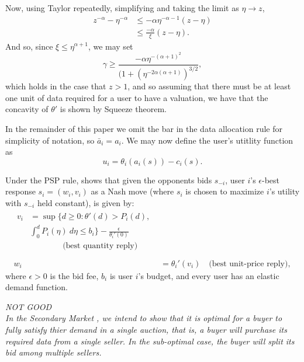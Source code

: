 \documentclass[12pt]{article}
\theoremstyle{definition}
\begin{document}
\begin{multicols}{2}
\begin{itemize}
Now, using Taylor repeatedly, simplifying and taking the limit as $\eta \rightarrow z$,
\begin{align*}
    z^{-\alpha} - \eta^{-\alpha} &\le -\alpha\eta^{-\alpha-1}(z-\eta) \\
    & \le \frac{-\alpha}{\xi}(z-\eta).
\end{align*}
And so, since $\xi \le \eta^{\alpha+1}$,
we may set
$$
    \gamma \ge
\frac{-\alpha\eta^{-(\alpha+1)^2}}{\big(1+(\eta^{-2\alpha(\alpha+1)})^{3/2}},
$$
which holds in the case that $z > 1$, and so assuming that there must be at least one
unit of data required for a user to have
a valuation,  we have that the concavity of $\theta'$ is shown by Squeeze theorem.
\end{itemize}

In the remainder of this paper we omit the bar in the data allocation rule for
simplicity of notation, so $\bar{a}_i = a_i$. We may now define the user's utitlity function as
\begin{equation}\label{utility}
    u_i = \theta_i(a_i(s)) - c_i(s).
\end{equation}

Under the PSP rule, \cite{lazar} shows that given the opponents bids $s_{-i}$,
user $i$'s $\epsilon$-best response $s_i = (w_i, v_i)$ as a Nash move
(where $s_i$ is chosen to maximize $i$'s utility with $s_{-i}$ held constant), is
given by:
\begin{align}
\begin{split}
    v_i &= \sup\bigg\lbrace d \ge 0 : \theta '(d) > P_i(d), \\ 
&\displaystyle\int_0^d P_i(\eta) \ d\eta \le b_i\bigg\rbrace -
\frac{\epsilon}{\theta_i'(0)} \\
&\qquad\qquad \text{(best quantity reply)} \\
\end{split}\\
    w_i &= \theta_i'(v_i) \quad \text{(best unit-price reply)},
\end{align}
where $\epsilon > 0$ is the bid fee, $b_i$ is user $i$'s budget, and every user
has an elastic demand function.

\emph{NOT GOOD\\
In the Secondary Market \cite{zheng}, we intend to show that it is optimal for a
buyer to fully satisfy thier demand in a single auction, that is, a buyer
will purchase its required data from a single seller. In the sub-optimal case,
the buyer will split its bid among multiple sellers. }


\end{multicols}
\end{document}

